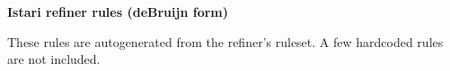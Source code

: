 \documentclass[11pt]{article}
\begin{document}
\begin{center}
{\Large\bf Istari refiner rules (deBruijn form)}
\end{center}

These rules are autogenerated from the refiner's ruleset.  A few
hardcoded rules are not included.


\end{document}
